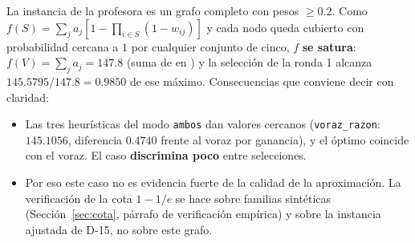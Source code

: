 La instancia de la profesora es un grafo completo con pesos $\ge0.2$. Como $f(S)=\sum_j a_j[1-\prod_{i\in S}(1-w_{ij})]$ y cada nodo queda cubierto con probabilidad cercana a $1$ por cualquier conjunto de cinco, $f$ \textbf{se satura}: $f(V)=\sum_ja_j=147.8$ (suma de  en ) y la selección de la ronda 1 alcanza $145.5795/147.8=0.9850$ de ese máximo. Consecuencias que conviene decir con claridad:
\begin{itemize}[leftmargin=*]
\item Las tres heurísticas del modo \texttt{ambos} dan valores cercanos (\texttt{voraz\_razon}: $145.1056$, diferencia $0.4740$ frente al voraz por ganancia), y el óptimo coincide con el voraz. El caso \textbf{discrimina poco} entre selecciones.
\item Por eso este caso no es evidencia fuerte de la calidad de la aproximación. La verificación de la cota $1-1/e$ se hace sobre familias sintéticas (Sección~\ref{sec:cota}, párrafo de verificación empírica) y sobre la instancia ajustada de D-15, no sobre este grafo.
\end{itemize}
